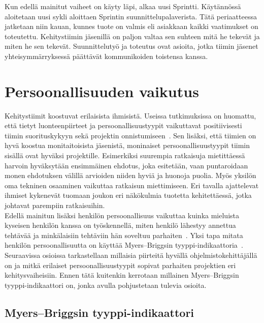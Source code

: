 \documentclass[finnish]{../tktltiki2}
\theoremstyle{definition}
\theoremstyle{remark}
\begin{document}
Kun edellä mainitut vaiheet on käyty läpi, alkaa uusi
Sprintti. Käytännössä aloitetaan uusi sykli aloittaen
Sprintin suunnittelupalaverista. Tätä periaatteessa jatketaan
niin kauan, kunnes tuote on valmis eli asiakkaan kaikki vaatimukset
on toteutettu. Kehitystiimin jäsenillä on paljon valtaa sen suhteen mitä he tekevät ja miten he
sen tekevät. Suunnittelutyö ja toteutus ovat asioita, jotka tiimin
jäsenet yhteisymmärryksessä päättävät kommunikoiden toistensa kanssa.

\section{Persoonallisuuden vaikutus}

Kehitystiimit koostuvat erilaisista ihmisistä. Useissa tutkimuksissa on huomattu, että tietyt
luonteenpiirteet ja persoonallisuustyypit vaikuttavat positiivisesti tiimin suorituskykyyn sekä
projektin onnistumiseen~\cite{Acuna:2008:ESP:1414004.1414056,Capretz:2003:PTS:766407.766410,Capretz:2010:MSS:1726559.1726574,Gorla:2004:WWB:990680.990684}. Sen lisäksi, että tiimien on hyvä koostua monitaitoisista
jäsenistä, moninaiset persoonallisuustyypit tiimin sisällä ovat hyväksi
projektille. Esimerkiksi suurempia ratkaisuja mietittäessä harvoin hyväksytään
ensimmäinen ehdotus, joka esitetään, vaan puntaroidaan monen ehdotuksen
välillä arvioiden niiden hyviä ja huonoja puolia. Myös yksilön oma
tekninen osaaminen vaikuttaa ratkaisun miettimiseen. Eri tavalla ajattelevat ihmiset kykenevät tuomaan joukon
eri näkökulmia tuotetta kehitettäessä, jotka johtavat parempiin ratkaisuihin.\\

Edellä mainitun lisäksi henkilön persoonallisuus vaikuttaa
kuinka mieluista kyseisen henkilön kanssa on työskennellä,
miten henkilö lähestyy annettua tehtävää ja minkälaisiin tehtäviin
hän soveltuu parhaiten~\cite{Begel:2008:PPW:1414004.1414026,Capretz:2010:MSS:1726559.1726574}. Yksi tapa mitata henkilön persoonallisuutta on käyttää Myers--Briggsin tyyppi-indikaattoria~\cite{Capretz:2003:PTS:766407.766410,Capretz:2010:MSS:1726559.1726574,DaCunha:2007:PMA:1230819.1241672}.
Seuraavissa osioissa tarkastellaan millaisia piirteitä hyvällä
ohjelmistokehittäjällä on ja mitkä erilaiset persoonallisuustyypit
sopivat parhaiten projektien eri kehitysvaiheisiin. Ennen tätä kuitenkin kerrotaan millainen Myers--Briggsin tyyppi-indikaattori on, jonka avulla pohjustetaan tulevia osioita.

\subsection{Myers--Briggsin tyyppi-indikaattori}
\end{document}

